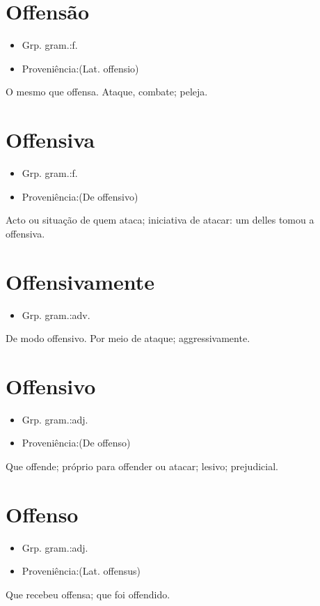 \section{Offensão}
\begin{itemize}
\item {Grp. gram.:f.}
\end{itemize}
\begin{itemize}
\item {Proveniência:(Lat. \textunderscore offensio\textunderscore )}
\end{itemize}
O mesmo que \textunderscore offensa\textunderscore .
Ataque, combate; peleja.
\section{Offensiva}
\begin{itemize}
\item {Grp. gram.:f.}
\end{itemize}
\begin{itemize}
\item {Proveniência:(De \textunderscore offensivo\textunderscore )}
\end{itemize}
Acto ou situação de quem ataca; iniciativa de atacar: \textunderscore um delles tomou a offensiva\textunderscore .
\section{Offensivamente}
\begin{itemize}
\item {Grp. gram.:adv.}
\end{itemize}
De modo offensivo.
Por meio de ataque; aggressivamente.
\section{Offensivo}
\begin{itemize}
\item {Grp. gram.:adj.}
\end{itemize}
\begin{itemize}
\item {Proveniência:(De \textunderscore offenso\textunderscore )}
\end{itemize}
Que offende; próprio para offender ou atacar; lesivo; prejudicial.
\section{Offenso}
\begin{itemize}
\item {Grp. gram.:adj.}
\end{itemize}
\begin{itemize}
\item {Proveniência:(Lat. \textunderscore offensus\textunderscore )}
\end{itemize}
Que recebeu offensa; que foi offendido.
